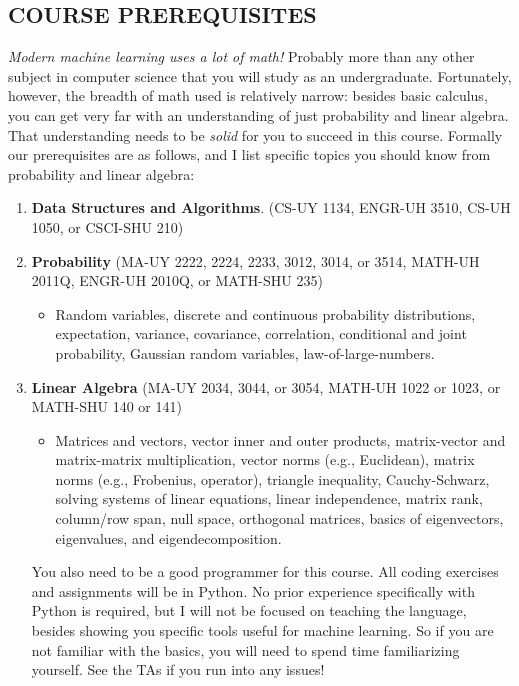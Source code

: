 \documentclass[10pt]{article}
\begin{document}
\subsection{COURSE PREREQUISITES}
\emph{Modern machine learning uses a lot of math!} Probably more than any other subject in computer science that you will study as an undergraduate. Fortunately, however, the {breadth} of math used is relatively narrow: besides basic calculus, you can get  very far with an understanding of just probability and linear algebra. That understanding needs to be \emph{solid} for you to succeed in this course. 
Formally our prerequisites are as follows, and I list specific topics you should know from probability and linear algebra:
\begin{enumerate}[leftmargin=*]
	\item \textbf{Data Structures and Algorithms}. (CS-UY 1134, ENGR-UH 3510, CS-UH 1050, or CSCI-SHU 210) 
	\item \textbf{Probability} (MA-UY 2222, 2224, 2233, 3012, 3014, or 3514, MATH-UH 2011Q, ENGR-UH 2010Q, or MATH-SHU 235)
	\begin{itemize}
		\item Random variables, discrete and continuous probability distributions, expectation, variance, covariance, correlation, conditional and joint probability, Gaussian random variables, law-of-large-numbers. 
	\end{itemize}
	\item \textbf{Linear Algebra} (MA-UY 2034, 3044, or 3054, MATH-UH 1022 or 1023, or MATH-SHU 140 or 141)
		\begin{itemize}
			\item Matrices and vectors, vector inner and outer products, matrix-vector and matrix-matrix multiplication, vector norms (e.g., Euclidean), matrix norms (e.g., Frobenius, operator), triangle inequality, Cauchy-Schwarz, solving systems of linear equations, linear independence, matrix rank, column/row span, null space, orthogonal matrices, basics of eigenvectors, eigenvalues, and eigendecomposition.
		\end{itemize}
	
You also need to be a good programmer for this course. All coding exercises and assignments will be in Python. No prior experience specifically with Python is required, but I will not be focused on teaching the language, besides showing you specific tools useful for machine learning. So if you are not familiar with the basics, you will need to spend time familiarizing yourself. See the TAs if you run into any issues!
\end{enumerate}
\end{document}
